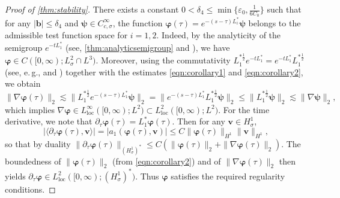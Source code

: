 \documentclass[10pt]{amsart}
\theoremstyle{plain}
\theoremstyle{definition}
\theoremstyle{remark}
\numberwithin{equation}{section}
\newcommand{\bb}{{\boldsymbol{b}}}
\newcommand{\bv}{{\boldsymbol{v}}}
\newcommand{\bw}{{\boldsymbol{w}}}
\newcommand{\bB}{{\boldsymbol{B}}}
\newcommand{\vp}{\varphi}
\newcommand{\ve}{\varepsilon}
\begin{document}
\begin{proof}[Proof of \cref{thm:stability}]
There exists a constant $0<\delta_4\le \min \{ \ve_0, \frac{1}{6C_0}\}$ such that for any $|\bb|\le\delta_4$ and $\boldsymbol{\psi}\in C^{\infty}_{c,\sigma}$, the function $\boldsymbol{\vp}(\tau)=e^{-(s-\tau)L_i^*}\boldsymbol{\psi}$ belongs to the admissible test function space for $i=1,2$.
Indeed, by the analyticity of the semigroup $e^{-tL_1^*}$ (see, \cref{thm:analyticsemigroup} and \cite[Theorem 3.1]{LZZ23}), we have $\boldsymbol{\vp}\in C([0,\infty);L^2_\sigma\cap L^3)$.  
Moreover, using the commutativity $L_1^{*\frac12}e^{-tL_1^*}=e^{-tL_1^*}L_1^{*\frac12}$ (see, e.\,g., \cite[Proposition 3.1.1(f)]{Haase06} and \cite[Theorem 1.2.4(c)]{Pazy1983}) together with the estimates \cref{eqn:corollary1} and \cref{eqn:corollary2}, we obtain
\[
\| \nabla \boldsymbol{\vp}(\tau) \|_2
\lesssim \| L_1^{*\frac{1}{2}} e^{-(s-\tau)L_1^*} \boldsymbol{\psi} \|_2  
= \| e^{-(s-\tau)L_1^*} L_1^{*\frac{1}{2}} \boldsymbol{\psi} \|_2  
\le \| L_1^{*\frac{1}{2}} \boldsymbol{\psi} \|_2 
\lesssim \|\nabla \boldsymbol{\psi} \|_2,
\]
which implies $\nabla\boldsymbol{\vp}\in L^\infty_{\mathrm{loc}}([0,\infty);L^2)\subset L^2_{\mathrm{loc}}([0,\infty);L^2)$.  
For the time derivative, we note that $\partial_\tau\boldsymbol{\vp}(\tau)=L_1^*\boldsymbol{\vp}(\tau)$. Then for any $\bv\in H^1_\sigma$,
\[
|\langle\partial_\tau\boldsymbol{\vp}(\tau),\bv\rangle|=|a_1(\boldsymbol{\vp}(\tau),\bv)|\le C\|\boldsymbol{\vp}(\tau)\|_{H^1}\|\bv\|_{H^1},
\]
so that by duality $\|\partial_\tau\boldsymbol{\vp}(\tau)\|_{(H^1_\sigma)^*}\le C(\|\boldsymbol{\vp}(\tau)\|_2+\|\nabla\boldsymbol{\vp}(\tau)\|_2)$.  
The boundedness of $\|\boldsymbol{\vp}(\tau)\|_2$ (from \cref{eqn:corollary2}) and of $\|\nabla\boldsymbol{\vp}(\tau)\|_2$ then yields $\partial_\tau\boldsymbol{\vp}\in L^2_{\mathrm{loc}}([0,\infty);(H^1_\sigma)^*)$.  
Thus $\boldsymbol{\vp}$ satisfies the required regularity conditions.


\end{proof}
\end{document}

